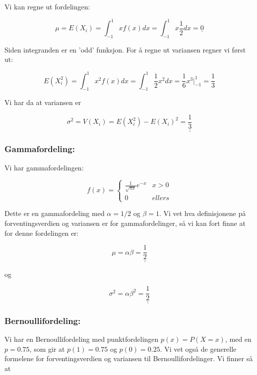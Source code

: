 \documentclass[a4paper,norsk, 10pt]{article}
\begin{document}
Vi kan regne ut fordelingen:

\begin{equation}
\mu = E(X_i) = \int_{-1}^1 xf(x) dx =\int_{-1}^1 x\frac{1}{2} dx = \underline{0} 
\end{equation}

Siden integranden er en 'odd' funksjon. For å regne ut variansen regner vi først ut:

\begin{equation}
E(X_i^2) = \int_{-1}^1 x^2f(x) dx = \int_{-1}^1 \frac{1}{2}x^2 dx =\frac{1}{6}x^3\bigg|_{-1}^1 = \frac{1}{3} 
\end{equation}

Vi har da at variansen er

\begin{equation}
\sigma^2 = V(X_i) = E(X_i^2) - E(X_i)^2 = \underline{\underline{\frac{1}{3}}}
\end{equation}

\subsubsection*{Gammafordeling:}

Vi har gammafordelingen:

\begin{equation}
f(x) =
\begin{cases}
\frac{1}{\sqrt{\pi x}}e^{-x} & x > 0\\
0 & ellers
\end{cases}
\end{equation}

Dette er en gammafordeling med $\alpha = 1/2$ og $\beta = 1$. Vi vet hva definisjonene på forventingsverdien og variansen er for gammafordelinger, så vi kan fort finne at for denne fordelingen er:

\begin{equation}
\mu = \alpha\beta = \underline{\underline{\frac{1}{2}}}
\end{equation}

og 

\begin{equation}
\sigma^2 = \alpha\beta^2 = \underline{\underline{\frac{1}{2}}}
\end{equation}


\subsubsection*{Bernoullifordeling:}

Vi har en Bernoullifordeling med punktfordelingen $p(x) = P(X = x)$, med en $p = 0.75$, som gir at $p(1) = 0.75$ og $p(0) = 0.25$. Vi vet også de generelle formelene for forventingsverdien og variansen til Bernoullifordelinger. Vi finner så at
\end{document}
